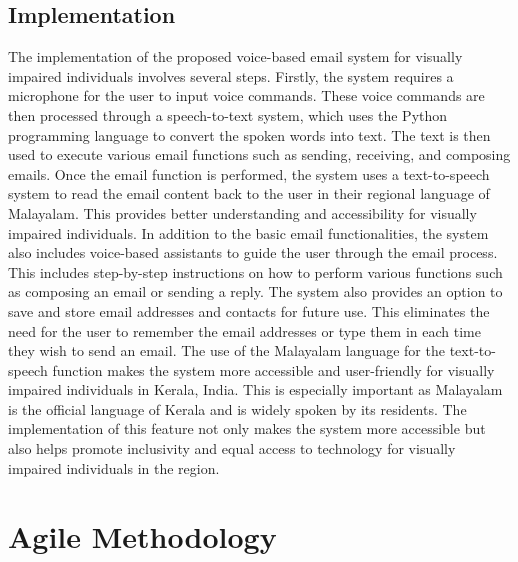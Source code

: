 \documentclass[12pt]{report}
\begin{document}
\newpage

\section{Implementation}
The implementation of the proposed voice-based email system for visually impaired individuals involves several steps. Firstly, the system requires a microphone for the user to input voice commands. These voice commands are then processed through a speech-to-text system, which uses the Python programming language to convert the spoken words into text. The text is then used to execute various email functions such as sending, receiving, and composing emails. Once the email function is performed, the system uses a text-to-speech system to read the email content back to the user in their regional language of Malayalam. This provides better understanding and accessibility for visually impaired individuals.\newline \newline
In addition to the basic email functionalities, the system also includes voice-based assistants to guide the user through the email process. This includes step-by-step instructions on how to perform various functions such as composing an email or sending a reply. The system also provides an option to save and store email addresses and contacts for future use. This eliminates the need for the user to remember the email addresses or type them in each time they wish to send an email.\newline \newline
The use of the Malayalam language for the text-to-speech function makes the system more accessible and user-friendly for visually impaired individuals in Kerala, India. This is especially important as Malayalam is the official language of Kerala and is widely spoken by its residents. The implementation of this feature not only makes the system more accessible but also helps promote inclusivity and equal access to technology for visually impaired individuals in the region.



\chapter{Agile Methodology}

\end{document}

